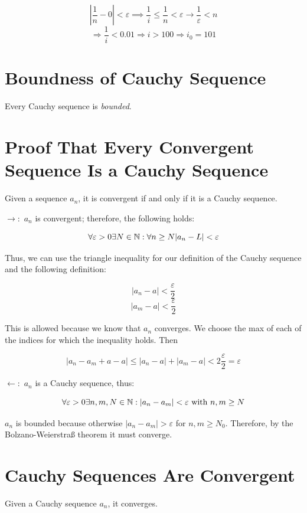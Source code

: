 \[
	\left|\frac{1}{n} - 0\right| < \varepsilon \implies \frac{1}{i} \le \frac{1}{n} < \varepsilon \rightarrow \frac{1}{\varepsilon} < n
\]
\[
	\Rightarrow \frac{1}{i} < 0.01 \Rightarrow i > 100
	\Rightarrow i_0 = 101
\]

\section{Boundness of Cauchy Sequence}

Every Cauchy sequence is \emph{bounded}.

\section{Proof That Every Convergent Sequence Is a Cauchy Sequence}

Given a sequence \(a_n\), it is convergent if and only if it is a Cauchy sequence.

\(\rightarrow :\) \(a_n\) is convergent; therefore, the following holds:

\[
	\forall \varepsilon > 0 \exists N \in \mathbb{N}: \forall n \ge N |a_n - L| < \varepsilon
\]

Thus, we can use the triangle inequality for our definition of the Cauchy sequence and the following
definition:

\[
	|a_n - a| < \frac{\varepsilon}{2}
\]
\[
	|a_m - a| < \frac{\varepsilon}{2}
\]

This is allowed because we know that \(a_n\) converges. We choose the max of each of the indices for which the inequality holds. Then

\[
	|a_n - a_m + a - a| \le |a_n - a| + |a_m - a| < 2\frac{\varepsilon}{2} = \varepsilon
\]

\(\leftarrow :\) \(a_n\) is a Cauchy sequence, thus:

\[
	\forall \varepsilon > 0 \exists n,m,N \in \mathbb{N}: |a_n - a_m| < \varepsilon \text{ with } n, m \ge N
\]

\(a_n\) is bounded because otherwise \( |a_n - a_m| > \varepsilon \) for \(n,m \ge N_0\). Therefore, by the Bolzano-Weierstraß theorem
it must converge.

\QED

\section{Cauchy Sequences Are Convergent}

Given a Cauchy sequence \(a_n\), it converges.


